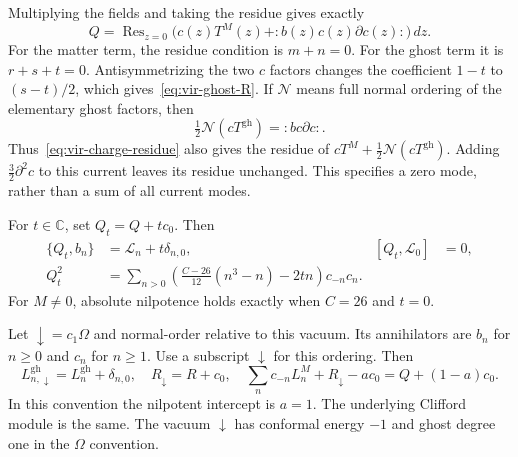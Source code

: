 Multiplying the fields and taking the residue gives exactly
\begin{equation}\label{eq:vir-charge-residue}
 Q=\operatorname{Res}_{z=0}
 \bigl(c(z)T^M(z)+:b(z)c(z)\partial c(z):\bigr)\,dz.
\end{equation}
For the matter term, the residue condition is $m+n=0$.
For the ghost term it is $r+s+t=0$.
Antisymmetrizing the two $c$ factors changes the coefficient $1-t$ to $(s-t)/2$, which gives~\eqref{eq:vir-ghost-R}.
If $\mathcal N$ means full normal ordering of the elementary ghost factors, then
\[
 \tfrac12\mathcal N(cT^{\mathrm{gh}})=:bc\partial c:.
\]
Thus~\eqref{eq:vir-charge-residue} also gives the residue of
$cT^M+\tfrac12\mathcal N(cT^{\mathrm{gh}})$.
Adding $\tfrac32\partial^2c$ to this current leaves its residue unchanged.
This specifies a zero mode, rather than a sum of all current modes.

\begin{proposition}\label{prop:vir-intercept}
For $t\in\mathbb C$, set $Q_t=Q+tc_0$.
Then
\begin{align}
 \{Q_t,b_n\}&=\mathcal L_n+t\delta_{n,0},
 & [Q_t,\mathcal L_0]&=0,
 \label{eq:vir-intercept-zero}\\
 Q_t^2&=\sum_{n>0}
 \left(\frac{C-26}{12}(n^3-n)-2tn\right)c_{-n}c_n.
 \label{eq:vir-intercept-square}
\end{align}
For $M\neq0$, absolute nilpotence holds exactly when $C=26$ and $t=0$.

Let $\downarrow=c_1\Omega$ and normal-order relative to this vacuum.
Its annihilators are $b_n$ for $n\geq0$ and $c_n$ for $n\geq1$.
Use a subscript $\downarrow$ for this ordering.
Then
\begin{equation}\label{eq:vir-intercept-dictionary}
 L_{n,\downarrow}^{\mathrm{gh}}=L_n^{\mathrm{gh}}+\delta_{n,0},
 \quad R_{\downarrow}=R+c_0,
 \quad
 \sum_n c_{-n}L_n^M+R_{\downarrow}-ac_0=Q+(1-a)c_0.
\end{equation}
In this convention the nilpotent intercept is $a=1$.
The underlying Clifford module is the same.
The vacuum $\downarrow$ has conformal energy $-1$ and ghost degree one in the $\Omega$ convention.
\end{proposition}

